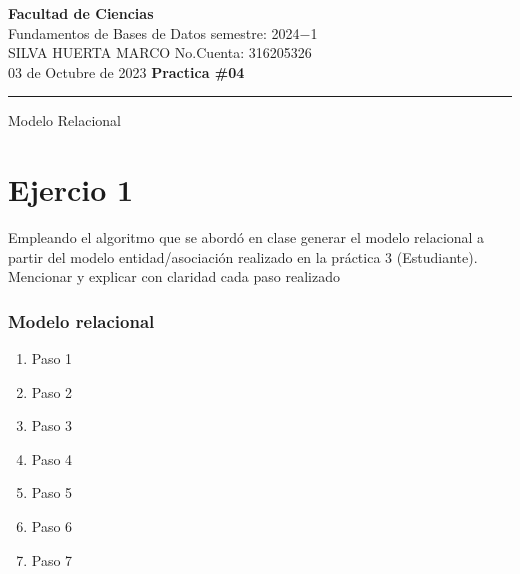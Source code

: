 \documentclass[a4paper,12pt]{article}
\begin{document}
\pagecolor{black}
\color{white}

\thispagestyle{firstpage} %
\noindent
\large\textbf{Facultad de Ciencias} \\
Fundamentos de Bases de Datos \hfill semestre: 2024$-$1 \\
\textsc{SILVA HUERTA MARCO}   \hfill No.Cuenta: 316205326    \\
03 de Octubre de 2023      \hfill \textbf{Practica \#04}    \\
\noindent\rule{7.3in}{2.8pt}

\begin{center}
\textcolor{sun}{\Large{Modelo Relacional}}
\end{center}

\section*{Ejercio 1}
\textcolor{sun}{Empleando el algoritmo que se abordó en clase generar el modelo
relacional a partir del modelo entidad/asociación realizado en la práctica 3 (Estudiante). Mencionar y explicar con claridad cada paso realizado}
\thispagestyle{fancy} %
\subsubsection*{Modelo relacional}
\begin{enumerate}
  \item[] Paso 1
  \item[] Paso 2
  \item[] Paso 3
  \item[] Paso 4
  \item[] Paso 5
  \item[] Paso 6
  \item[] Paso 7
\end{enumerate}
\end{document}
